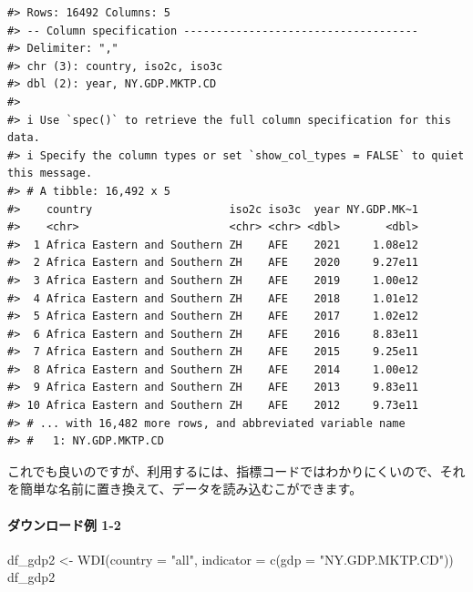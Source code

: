 \documentclass[
]{bxjsbook}
\newenvironment{Shaded}{\begin{snugshade}}{\end{snugshade}}
\newcommand{\AttributeTok}[1]{\textcolor[rgb]{0.77,0.63,0.00}{#1}}
\newcommand{\FunctionTok}[1]{\textcolor[rgb]{0.00,0.00,0.00}{#1}}
\newcommand{\NormalTok}[1]{#1}
\newcommand{\OtherTok}[1]{\textcolor[rgb]{0.56,0.35,0.01}{#1}}
\newcommand{\StringTok}[1]{\textcolor[rgb]{0.31,0.60,0.02}{#1}}
\theoremstyle{definition}
\theoremstyle{definition}
\theoremstyle{definition}
\theoremstyle{definition}
\theoremstyle{remark}
\begin{document}
\begin{verbatim}
#> Rows: 16492 Columns: 5
#> -- Column specification ------------------------------------
#> Delimiter: ","
#> chr (3): country, iso2c, iso3c
#> dbl (2): year, NY.GDP.MKTP.CD
#> 
#> i Use `spec()` to retrieve the full column specification for this data.
#> i Specify the column types or set `show_col_types = FALSE` to quiet this message.
#> # A tibble: 16,492 x 5
#>    country                     iso2c iso3c  year NY.GDP.MK~1
#>    <chr>                       <chr> <chr> <dbl>       <dbl>
#>  1 Africa Eastern and Southern ZH    AFE    2021     1.08e12
#>  2 Africa Eastern and Southern ZH    AFE    2020     9.27e11
#>  3 Africa Eastern and Southern ZH    AFE    2019     1.00e12
#>  4 Africa Eastern and Southern ZH    AFE    2018     1.01e12
#>  5 Africa Eastern and Southern ZH    AFE    2017     1.02e12
#>  6 Africa Eastern and Southern ZH    AFE    2016     8.83e11
#>  7 Africa Eastern and Southern ZH    AFE    2015     9.25e11
#>  8 Africa Eastern and Southern ZH    AFE    2014     1.00e12
#>  9 Africa Eastern and Southern ZH    AFE    2013     9.83e11
#> 10 Africa Eastern and Southern ZH    AFE    2012     9.73e11
#> # ... with 16,482 more rows, and abbreviated variable name
#> #   1: NY.GDP.MKTP.CD
\end{verbatim}

これでも良いのですが、利用するには、指標コードではわかりにくいので、それを簡単な名前に置き換えて、データを読み込むこができます。

\hypertarget{ux30c0ux30a6ux30f3ux30edux30fcux30c9ux4f8b-1-2}{%
\paragraph{ダウンロード例 1-2}\label{ux30c0ux30a6ux30f3ux30edux30fcux30c9ux4f8b-1-2}}

\begin{Shaded}
\begin{Highlighting}[]
\NormalTok{df\_gdp2 }\OtherTok{\textless{}{-}} \FunctionTok{WDI}\NormalTok{(}\AttributeTok{country =} \StringTok{"all"}\NormalTok{, }\AttributeTok{indicator =} \FunctionTok{c}\NormalTok{(}\AttributeTok{gdp =} \StringTok{"NY.GDP.MKTP.CD"}\NormalTok{))}
\NormalTok{df\_gdp2}
\end{Highlighting}
\end{Shaded}
\end{document}
